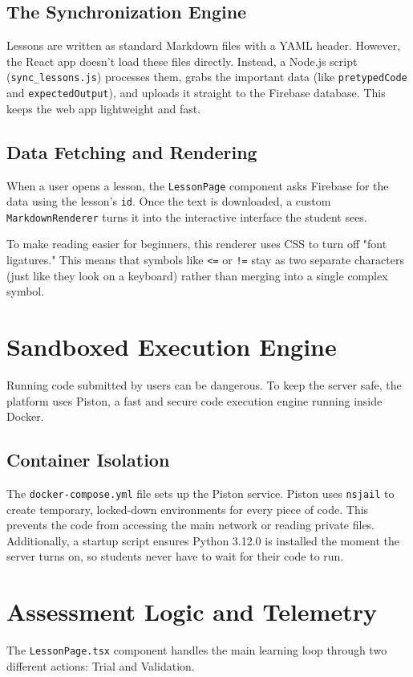 \documentclass[12pt]{report}
\begin{document}
\subsection{The Synchronization Engine}
Lessons are written as standard Markdown files with a YAML header. However, the React app doesn't load these files directly. Instead, a Node.js script (\texttt{sync\_lessons.js}) processes them, grabs the important data (like \texttt{pretypedCode} and \texttt{expectedOutput}), and uploads it straight to the Firebase database. This keeps the web app lightweight and fast.

\subsection{Data Fetching and Rendering}
When a user opens a lesson, the \texttt{LessonPage} component asks Firebase for the data using the lesson's \texttt{id}. Once the text is downloaded, a custom \texttt{MarkdownRenderer} turns it into the interactive interface the student sees. 

To make reading easier for beginners, this renderer uses CSS to turn off "font ligatures." This means that symbols like \texttt{<=} or \texttt{!=} stay as two separate characters (just like they look on a keyboard) rather than merging into a single complex symbol.

\section{Sandboxed Execution Engine}
Running code submitted by users can be dangerous. To keep the server safe, the platform uses Piston, a fast and secure code execution engine running inside Docker.

\subsection{Container Isolation}
The \texttt{docker-compose.yml} file sets up the Piston service. Piston uses \texttt{nsjail} to create temporary, locked-down environments for every piece of code. This prevents the code from accessing the main network or reading private files. Additionally, a startup script ensures Python 3.12.0 is installed the moment the server turns on, so students never have to wait for their code to run.

\section{Assessment Logic and Telemetry}
The \texttt{LessonPage.tsx} component handles the main learning loop through two different actions: Trial and Validation.
\end{document}
